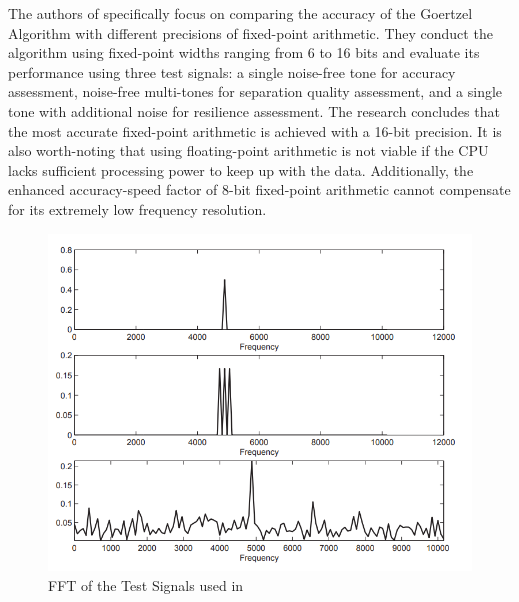 The authors of \cite{6912785} specifically focus on comparing the accuracy of the Goertzel Algorithm with different precisions of fixed-point arithmetic. They conduct the algorithm using fixed-point widths ranging from 6 to 16 bits and evaluate its performance using three test signals: a single noise-free tone for accuracy assessment, noise-free multi-tones for separation quality assessment, and a single tone with additional noise for resilience assessment. The research concludes that the most accurate fixed-point arithmetic is achieved with a 16-bit precision. It is also worth-noting that using floating-point arithmetic is not viable if the CPU lacks sufficient processing power to keep up with the data. Additionally, the enhanced accuracy-speed factor of 8-bit fixed-point arithmetic cannot compensate for its extremely low frequency resolution.
\begin{figure}
    \centering
    \includegraphics[width=0.75\linewidth]{img/image_2023-06-28_171752016.png}
    \caption{ FFT of the Test Signals used in \cite{6912785}}
    \label{fig:fixed_point_arithmetic_test_signals}
\end{figure}

